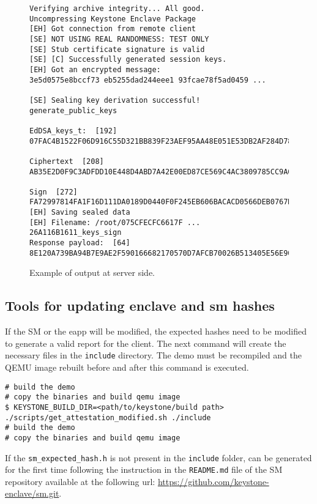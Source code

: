\begin{figure}[H]
\begin{lstlisting}[frame=single]
Verifying archive integrity... All good.
Uncompressing Keystone Enclave Package
[EH] Got connection from remote client
[SE] NOT USING REAL RANDOMNESS: TEST ONLY
[SE] Stub certificate signature is valid
[SE] [C] Successfully generated session keys.
[EH] Got an encrypted message:
3e5d0575e8bccf73 eb5255dad244eee1 93fcae78f5ad0459 ...

[SE] Sealing key derivation successful!
generate_public_keys

EdDSA_keys_t:  [192]
07FAC4B1522F06D916C55D321BB839F23AEF95AA48E051E53DB2AF284D7845...

Ciphertext  [208]
AB35E2D0F9C3ADFDD10E448D4ABD7A42E00ED87CE569C4AC3809785CC9A028...

Sign  [272]
FA72997814FA1F16D111DA0189D0440F0F245EB606BACACD0566DEB0767D44...
[EH] Saving sealed data
[EH] Filename: /root/075CFECFC6617F ... 26A116B1611_keys_sign
Response payload:  [64]
8E120A739BA94B7E9AE2F590166682170570D7AFCB70026B513405E56E90C1...
\end{lstlisting}
\caption{Example of output at server side. \label{l-demo-s}}
\end{figure}

\subsection{Tools for updating enclave and sm hashes}
If the SM or the eapp will be modified, the expected hashes need to be modified to generate a valid report for the client. The next command will create the necessary files in the \texttt{include} directory. The demo must be recompiled and the QEMU image rebuilt before and after this command is executed. \\

\begin{lstlisting}[style=terminal,frame=single]
# build the demo
# copy the binaries and build qemu image
$ KEYSTONE_BUILD_DIR=<path/to/keystone/build path> ./scripts/get_attestation_modified.sh ./include
# build the demo
# copy the binaries and build qemu image
\end{lstlisting}

If the \texttt{sm\_expected\_hash.h} is not present in the \texttt{include} folder, can be generated for the first time following the instruction in the \texttt{README.md} file of the SM repository available at the following url: \url{https://github.com/keystone-enclave/sm.git}. 

